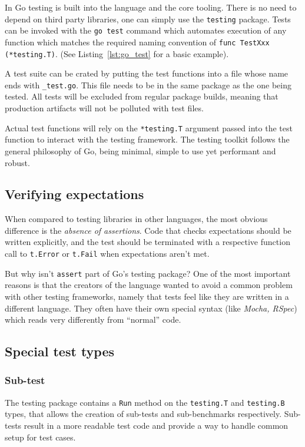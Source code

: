 In Go testing is built into the language and the core tooling. There is no need to depend on third party libraries, one can simply use the \texttt{testing} package. Tests can be invoked with the \texttt{go test} command which automates execution of any function which matches the required naming convention\cite{go-testing} of \texttt{func TestXxx (*testing.T)}. (See Listing~\ref{lst:go_test} for a basic example).



A test suite can be crated by putting the test functions into a file whose name ends with \texttt{\_test.go}. This file needs to be in the same package as the one being tested. All tests will be excluded from regular package builds\cite{go-testing}, meaning that production artifacts will not be polluted with test files.

Actual test functions will rely on the \texttt{*testing.T} argument passed into the test function to interact with the testing framework. The testing toolkit follows the general philosophy of Go, being minimal, simple to use yet performant and robust.

\subsection{Verifying expectations}

When compared to testing libraries in other languages, the most obvious difference is the \emph{absence of assertions}. Code that checks expectations should be written explicitly, and the test should be terminated with a respective function call to \texttt{t.Error} or \texttt{t.Fail} when expectations aren't met.

But why isn't \texttt{assert} part of Go's testing package? One of the most important reasons is that the creators of the language wanted to avoid a common problem with other testing frameworks, namely that tests feel like they are written in a different language\cite{go-book}. They often have their own special syntax (like \textit{Mocha, RSpec}) which reads very differently from ``normal'' code.

\subsection{Special test types}

\subsubsection{Sub-test}
The testing package contains a \texttt{Run} method on the \texttt{testing.T} and \texttt{testing.B} types, that allows the creation of sub-tests and sub-benchmarks respectively. Sub-tests result in a more readable test code and provide a way to handle common setup for test cases.

